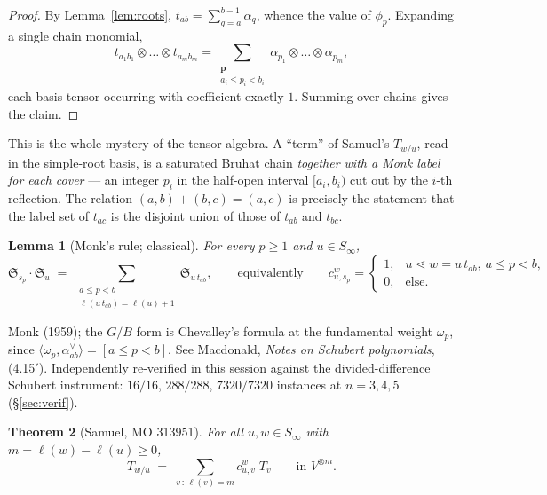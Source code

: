 \documentclass[11pt]{article}
\theoremstyle{plain}
\newtheorem{theorem}{Theorem}
\newtheorem{lemma}[theorem]{Lemma}
\theoremstyle{definition}
\newcommand{\Sch}{\mathfrak{S}}
\newcommand{\sw}{S_\infty}
\DeclareMathOperator{\len}{\ell}
\begin{document}
\begin{proof}
By Lemma~\ref{lem:roots}, $t_{ab}=\sum_{q=a}^{b-1}\alpha_{q}$, whence the
value of $\phi_{p}$. Expanding a single chain monomial,
\[
  t_{a_{1}b_{1}}\otimes\dots\otimes t_{a_{m}b_{m}}
  =\sum_{\substack{\mathbf{p}\\ a_{i}\le p_{i}<b_{i}}}
    \alpha_{p_{1}}\otimes\dots\otimes\alpha_{p_{m}},
\]
each basis tensor occurring with coefficient exactly $1$. Summing over chains
gives the claim.
\end{proof}

This is the whole mystery of the tensor algebra. A ``term'' of Samuel's
$T_{w/u}$, read in the simple-root basis, is a saturated Bruhat chain
\emph{together with a Monk label for each cover} --- an integer $p_{i}$ in the
half-open interval $[a_{i},b_{i})$ cut out by the $i$-th reflection. The
relation $(a,b)+(b,c)=(a,c)$ is precisely the statement that the label set of
$t_{ac}$ is the disjoint union of those of $t_{ab}$ and $t_{bc}$.

\begin{lemma}[Monk's rule; classical]\label{lem:monk}
For every $p\ge1$ and $u\in\sw$,
\[
  \Sch_{s_{p}}\cdot\Sch_{u}
  \;=\;\sum_{\substack{a\le p<b\\ \len(u\,t_{ab})=\len(u)+1}}\Sch_{u\,t_{ab}},
  \qquad\text{equivalently}\qquad
  c^{w}_{u,s_{p}}=
  \begin{cases}1,& u\lessdot w=u\,t_{ab},\ a\le p<b,\\ 0,&\text{else.}\end{cases}
\]
\end{lemma}

\noindent Monk (1959); the $G/B$ form is Chevalley's formula at the fundamental
weight $\omega_{p}$, since $\langle\omega_{p},\alpha_{ab}^{\vee}\rangle=[a\le p<b]$.
See Macdonald, \emph{Notes on Schubert polynomials}, (4.15$'$).
Independently re-verified in this session against the divided-difference
Schubert instrument: $16/16$, $288/288$, $7320/7320$ instances at
$n=3,4,5$ (\S\ref{sec:verif}).

\begin{theorem}[Samuel, MO 313951]\label{thm:samuel}
For all $u,w\in\sw$ with $m=\len(w)-\len(u)\ge0$,
\[
  T_{w/u}\;=\;\sum_{v\,:\,\len(v)=m}c_{u,v}^{w}\;T_{v}
  \qquad\text{in }V^{\otimes m}.
\]
\end{theorem}
\end{document}
